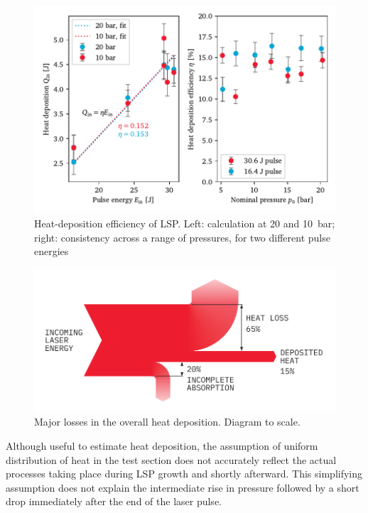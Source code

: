             \begin{figure}[h]
                \centering
                \includegraphics[]{assets/5 results/heatEfficiency}
                \caption[Heat-deposition efficiency of LSP]{Heat-deposition efficiency of LSP. Left: calculation at 20 and 10~bar; right: consistency across a range of pressures, for two different pulse energies}
                \label{fig:heatEfficiency}
            \end{figure}

            \begin{figure}[h]
                \centering
                \includegraphics[]{assets/5 results/heatdep_contribs.pdf}
                \caption{Major losses in the overall heat deposition. Diagram to scale.}
                \label{fig:heatdep_sankey}
            \end{figure}

            Although useful to estimate heat deposition, the assumption of uniform distribution of heat in the test section does not accurately reflect the actual processes taking place during LSP growth and shortly afterward. This simplifying assumption does not explain the intermediate rise in pressure followed by a short drop immediately after the end of the laser pulse.

